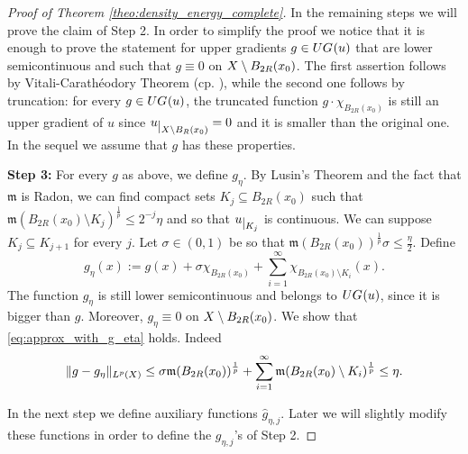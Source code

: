 \documentclass[12pt]{amsart}
\newcommand{\restr}[1]{\lower3pt\hbox{$|_{#1}$}}
\newcommand{\X}{{\rm X}}
\newcommand{\mm}{\mathfrak m}
\theoremstyle{definition}
\newcommand{\UG}[1]{{\rm UG}^{#1}}
\begin{document}
\begin{proof}[Proof of Theorem \ref{theo:density_energy_complete}]
    In the remaining steps we will prove the claim of Step 2. In order to simplify the proof we notice that it is enough to prove the statement for upper gradients $g\in \UG{}(u)$ that are lower semicontinuous and such that $g \equiv 0$ on $\X\setminus B_{2R}(x_0)$. The first assertion follows by Vitali-Carathéodory Theorem (cp. \cite[page 108]{HKST15}), while the second one follows by truncation: for every $g\in \UG{}(u)$, the truncated function $g\cdot \chi_{B_{2R}(x_0)}$ is still an upper gradient of $u$ since $u\restr{\X\setminus B_R(x_0)} = 0$ and it is smaller than the original one. In the sequel we assume that $g$ has these properties.
    \vspace{2mm}

    {\bf Step 3:} For every $g$ as above, we define $g_\eta$. By Lusin's Theorem and the fact that $\mm$ is Radon, we can find compact sets $K_j \subseteq B_{2R}(x_0)$ such that $\mm(B_{2R}(x_0) \setminus K_j)^{\frac{1}{p}} \le 2^{-j}\eta$ and so that $u\restr{K_j}$ is continuous. We can suppose $K_j \subseteq K_{j+1}$ for every $j$. Let $\sigma \in (0, 1)$ be so that $\mm(B_{2R}(x_0))^{\frac{1}{p}}\sigma \le \frac{\eta}{2}$.
    Define
        \begin{equation}
            g_\eta(x) := g(x) + \sigma\chi_{B_{2R}(x_0)} + \sum_{i=1}^\infty \chi_{B_{2R}(x_0)\setminus K_i}(x).
        \end{equation}
        The function $g_\eta$ is still lower semicontinuous and belongs to $\UG{}(u)$, since it is bigger than $g$. Moreover, $g_\eta \equiv 0$ on $\X \setminus B_{2R}(x_0)$. 
        We show that \eqref{eq:approx_with_g_eta} holds. Indeed
        \begin{equation}
            \Vert g - g_\eta \Vert_{L^p(\X)} \le \sigma \mm(B_{2R}(x_0))^{\frac{1}{p}} + \sum_{i=1}^\infty \mm(B_{2R}(x_0)\setminus K_i)^{\frac{1}{p}} \le \eta.
        \end{equation}

    In the next step we define auxiliary functions $\hat{g}_{\eta,j}$. Later we will slightly modify these functions in order to define the $g_{\eta,j}$'s of Step 2.
    \vspace{2mm}
    

\end{proof}
\end{document}
